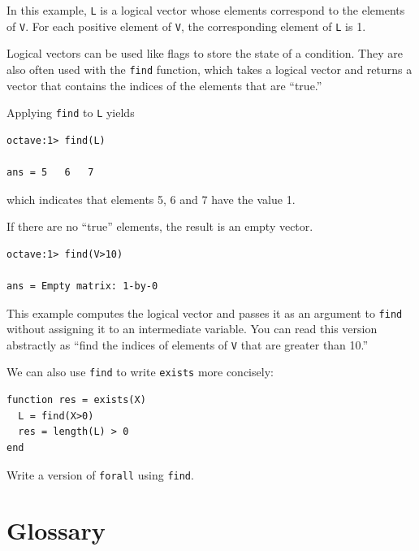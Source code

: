 \documentclass{book}
\begin{document}
In this example, {\tt L} is a logical vector whose elements
correspond to the elements of {\tt V}. For each positive element of
{\tt V}, the corresponding element of {\tt L} is 1.

Logical vectors can be used like flags to store the state of
a condition. They are also often used with the {\tt find} function,
which takes a logical vector and returns a vector that contains
the indices of the elements that are ``true.''

Applying {\tt find} to {\tt L} yields

\begin{verbatim}
octave:1> find(L)

ans = 5   6   7
\end{verbatim}

which indicates that elements 5, 6 and 7 have the value 1.

If there are no ``true'' elements, the result is an empty vector.

\begin{verbatim}
octave:1> find(V>10)

ans = Empty matrix: 1-by-0
\end{verbatim}

This example computes the logical vector and passes it as an
argument to {\tt find} without assigning it to an intermediate
variable. You can read this version abstractly as ``find
the indices of elements of {\tt V} that are greater than 10.''

We can also use {\tt find} to write {\tt exists} more concisely:

\begin{verbatim}
function res = exists(X)
  L = find(X>0)
  res = length(L) > 0
end
\end{verbatim}

\begin{ex}
Write a version of {\tt forall} using {\tt find}.
\end{ex}


\section{Glossary}
\end{document}
